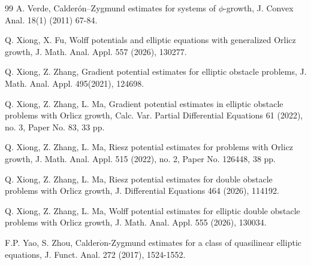 \documentclass[10pt,a4paper]{article}
\theoremstyle{definition}
\numberwithin{equation}{section}
\begin{document}
\begin{thebibliography}{99}
 A. Verde, Calder\'on–Zygmund estimates for systems  of $\phi$-growth, J. Convex Anal. 18(1) (2011) 67-84.

 Q. Xiong, X. Fu, Wolff potentials and elliptic equations with generalized Orlicz growth, J. Math. Anal. Appl. 557 (2026), 130277.

 Q. Xiong,  Z.  Zhang,  Gradient potential estimates for elliptic obstacle problems,  J. Math. Anal. Appl. 495(2021), 124698.

 Q. Xiong,  Z.  Zhang,   L. Ma,  Gradient potential estimates in elliptic obstacle problems with Orlicz growth, Calc. Var. Partial Differential Equations 61 (2022), no. 3, Paper No. 83, 33 pp.

  Q. Xiong,  Z.  Zhang,     L. Ma,  Riesz potential estimates for problems with Orlicz growth, J. Math. Anal. Appl. 515 (2022), no. 2, Paper No. 126448, 38 pp.


  Q. Xiong,  Z.  Zhang,    L. Ma, Riesz potential estimates for double obstacle problems with Orlicz growth, J. Differential Equations 464 (2026), 114192.

  Q. Xiong,  Z.  Zhang,    L. Ma, Wolff potential estimates for elliptic double obstacle problems with Orlicz growth, J. Math. Anal. Appl. 555 (2026), 130034.


F.P. Yao, S.  Zhou, Calder$\acute{o}$n-Zygmund estimates for a class of quasilinear elliptic equations, J. Funct. Anal. 272 (2017), 1524-1552.




\end{thebibliography}
\end{document}
